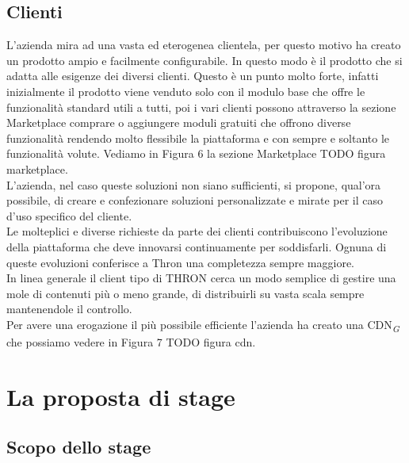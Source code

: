 \documentclass[a4paper, 12pt, twoside, openright]{book}
\newcommand{\gloss}[1]{#1\textsubscript{\textit{\tiny{G}}}}
\begin{document}
\section{Clienti}
L'azienda mira ad una vasta ed eterogenea clientela, per questo motivo ha creato un prodotto ampio e facilmente configurabile. In questo modo è il prodotto che si adatta alle esigenze dei diversi clienti. Questo è un punto molto forte, infatti inizialmente il prodotto viene venduto solo con il modulo base che offre le funzionalità standard utili a tutti, poi i vari clienti possono attraverso la sezione Marketplace comprare o aggiungere moduli gratuiti che offrono diverse funzionalità rendendo molto flessibile la piattaforma e con sempre e soltanto le funzionalità volute. Vediamo in Figura 6 la sezione Marketplace TODO figura marketplace.\\
L'azienda, nel caso queste soluzioni non siano sufficienti, si propone, qual'ora possibile, di creare e confezionare soluzioni personalizzate e mirate per il caso d'uso specifico del cliente.\\
Le molteplici e diverse richieste da parte dei clienti contribuiscono l'evoluzione della piattaforma che deve innovarsi continuamente per soddisfarli. Ognuna di queste evoluzioni conferisce a Thron una completezza sempre maggiore.\\
In linea generale il client tipo di THRON cerca un modo semplice di gestire una mole di contenuti più o meno grande, di distribuirli su vasta scala sempre mantenendole il controllo.\\
Per avere una erogazione il più possibile efficiente l'azienda ha creato una \gloss{CDN} che possiamo vedere in Figura 7 TODO figura cdn.\\

\chapter{La proposta di stage}

\section{Scopo dello stage}
\end{document}
